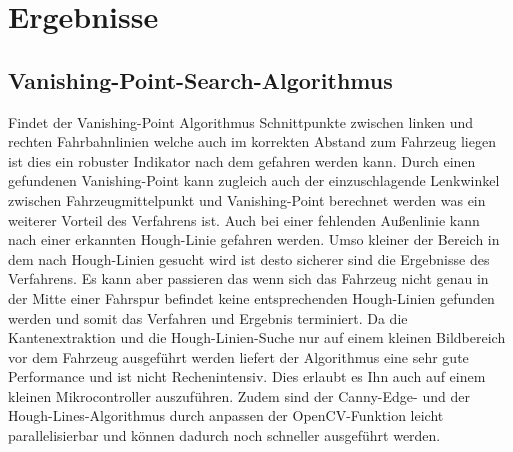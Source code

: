 %

\chapter{Ergebnisse}
\label{cha:Ergebnisse} 
%
%




\section{Vanishing-Point-Search-Algorithmus}
\label{section:Vanishing-Point-Search-Algorithmus} 

Findet der Vanishing-Point Algorithmus Schnittpunkte zwischen linken und rechten Fahrbahnlinien welche auch im korrekten Abstand zum Fahrzeug liegen ist dies ein robuster Indikator nach dem gefahren werden kann.
Durch einen gefundenen Vanishing-Point kann zugleich auch der einzuschlagende Lenkwinkel zwischen Fahrzeugmittelpunkt und Vanishing-Point berechnet werden was ein weiterer Vorteil des Verfahrens ist.
Auch bei einer fehlenden Au{\ss}enlinie kann nach einer erkannten Hough-Linie gefahren werden.
Umso kleiner der Bereich in dem nach Hough-Linien gesucht wird ist desto sicherer sind die Ergebnisse des Verfahrens. Es kann aber passieren das wenn sich das Fahrzeug nicht genau in der Mitte einer Fahrspur befindet keine entsprechenden Hough-Linien gefunden werden und somit das Verfahren und Ergebnis terminiert. Da die Kantenextraktion und die Hough-Linien-Suche nur auf einem kleinen Bildbereich vor dem Fahrzeug ausgef{\"u}hrt werden liefert der Algorithmus eine sehr gute Performance und ist nicht Rechenintensiv. Dies erlaubt es Ihn auch auf einem kleinen Mikrocontroller auszuf{\"u}hren. Zudem sind der Canny-Edge- und der Hough-Lines-Algorithmus durch anpassen der OpenCV-Funktion leicht parallelisierbar und k{\"o}nnen dadurch noch schneller ausgef{\"u}hrt werden.  



